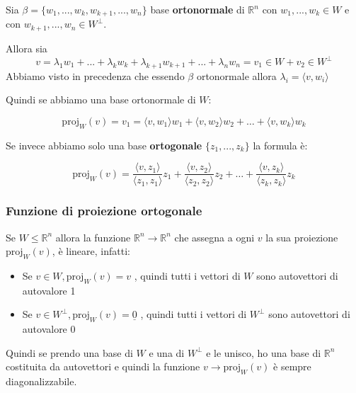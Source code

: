 \documentclass[
  a4paper,
]{article}
\providecommand{\tightlist}{%
  \setlength{\itemsep}{0pt}\setlength{\parskip}{0pt}}
\providecommand{\tightlist}{}
\begin{document}
Sia \(\beta = \{w_1, ..., w_k, w_{k+1}, ..., w_n\}\) base
\textbf{ortonormale} di \(\mathbb{R}^n\) con \(w_1, ..., w_k \in W\) e
con \(w_{k+1}, ..., w_n \in W^{\perp}\).

Allora sia \[
v = \lambda_1 w_1 +...+ \lambda_k w_k + \lambda_{k+1}w_{k+1} + ... + \lambda_n w_n = v_1 \in W + v_2 \in W^\perp
\] Abbiamo visto in precedenza che essendo \(\beta\) ortonormale allora
\(\lambda_i = \langle v, w_i \rangle\)

Quindi se abbiamo una base ortonormale di \(W\):

\begin{propositionbox}[Formula]
\[
\text{proj}_W(v) = v_1 = \langle v, w_1 \rangle w_1 + \langle v, w_2 \rangle w_2 + \dots + \langle v, w_k \rangle w_k
\]
\end{propositionbox}

Se invece abbiamo solo una base \textbf{ortogonale}
\(\{z_1, ..., z_k\}\) la formula è:

\begin{propositionbox}[Formula]
\[
\text{proj}_W(v) = \frac{\langle v, z_1 \rangle}{\langle z_1, z_1 \rangle}z_1 + \frac{\langle v, z_2 \rangle}{\langle z_2, z_2 \rangle}z_2 + \dots + \frac{\langle v, z_k \rangle}{\langle z_k, z_k \rangle}z_k
\]
\end{propositionbox}

\hypertarget{funzione-di-proiezione-ortogonale}{%
\subsubsection{Funzione di proiezione
ortogonale}\label{funzione-di-proiezione-ortogonale}}

\begin{observationbox}
Se \(W \leq \mathbb{R}^n\) allora la funzione
\(\mathbb{R}^n \to \mathbb{R}^n\) che assegna a ogni \(v\) la sua
proiezione \(\text{proj}_W(v)\), è lineare, infatti:

\begin{itemize}
\tightlist
\item
  Se \(v \in W, \text{proj}_W(v) = v\) , quindi tutti i vettori di \(W\)
  sono autovettori di autovalore 1
\item
  Se \(v \in W^\perp, \text{proj}_W(v) = \underline{0}\) , quindi tutti
  i vettori di \(W^\perp\) sono autovettori di autovalore 0
\end{itemize}

Quindi se prendo una base di \(W\) e una di \(W^\perp\) e le unisco, ho
una base di \(\mathbb{R}^n\) costituita da autovettori e quindi la
funzione \(v \to \text{proj}_W(v)\) è sempre diagonalizzabile.
\end{observationbox}
\end{document}
